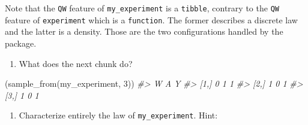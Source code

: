 \documentclass[
  11pt,
  openright,twoside]{book}
\newenvironment{Shaded}{\begin{snugshade}}{\end{snugshade}}
\newcommand{\CommentTok}[1]{\textcolor[rgb]{0.56,0.35,0.01}{\textit{#1}}}
\newcommand{\DecValTok}[1]{\textcolor[rgb]{0.00,0.00,0.81}{#1}}
\newcommand{\FunctionTok}[1]{\textcolor[rgb]{0.00,0.00,0.00}{#1}}
\newcommand{\NormalTok}[1]{#1}
\providecommand{\tightlist}{%
  \setlength{\itemsep}{0pt}\setlength{\parskip}{0pt}}
\theoremstyle{definition}
\theoremstyle{definition}
\theoremstyle{definition}
\theoremstyle{definition}
\theoremstyle{remark}
\begin{document}
Note that the \texttt{QW} feature of \texttt{my\_experiment} is a \texttt{tibble}, contrary to the
\texttt{QW} feature of \texttt{experiment} which is a \texttt{function}. The former describes a
discrete law and the latter is a density. Those are the two configurations
handled by the package.

\begin{enumerate}
\def\labelenumi{\arabic{enumi}.}
\setcounter{enumi}{2}
\tightlist
\item
  What does the next chunk do?
\end{enumerate}

\begin{Shaded}
\begin{Highlighting}[]
\NormalTok{(}\FunctionTok{sample\_from}\NormalTok{(my\_experiment, }\DecValTok{3}\NormalTok{))}
\CommentTok{\#\textgreater{}      W A Y}
\CommentTok{\#\textgreater{} [1,] 0 1 1}
\CommentTok{\#\textgreater{} [2,] 1 0 1}
\CommentTok{\#\textgreater{} [3,] 1 0 1}
\end{Highlighting}
\end{Shaded}

\begin{enumerate}
\def\labelenumi{\arabic{enumi}.}
\setcounter{enumi}{3}
\tightlist
\item
  Characterize entirely the law of \texttt{my\_experiment}. Hint:
\end{enumerate}
\end{document}
